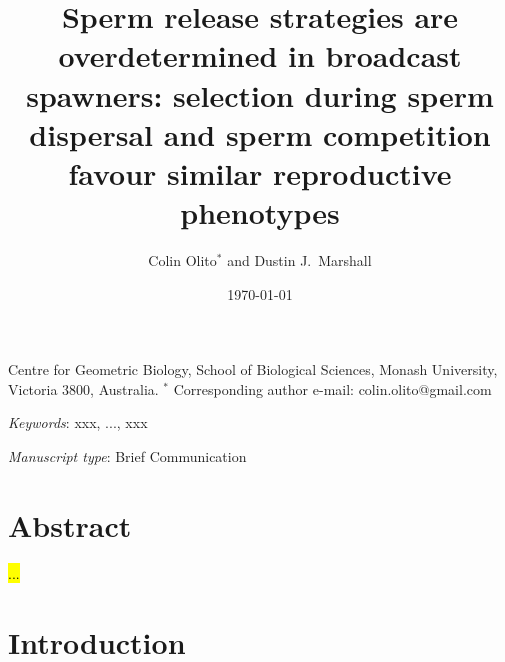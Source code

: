 \documentclass{article}
\title{Sperm release strategies are overdetermined in broadcast spawners: selection during sperm dispersal and sperm competition favour similar reproductive phenotypes}
\author{Colin Olito$^{\ast}$ and Dustin J.~Marshall}
\date{\today}
\begin{document}
\maketitle


\noindent{} Centre for Geometric Biology, School of Biological Sciences, Monash University, Victoria 3800, Australia.
\noindent{} $^\ast$ Corresponding author e-mail: colin.olito@gmail.com

\bigskip

\noindent{} \textit{Keywords}: xxx, ..., xxx

\bigskip

\noindent{} \textit{Manuscript type}: Brief Communication

\bigskip


\linenumbers
\modulolinenumbers[1]
\renewcommand\linenumberfont{\normalfont\small}


\newpage{}
\section*{Abstract}

\noindent{} \hl{...}

\section*{Introduction}

\end{document}
